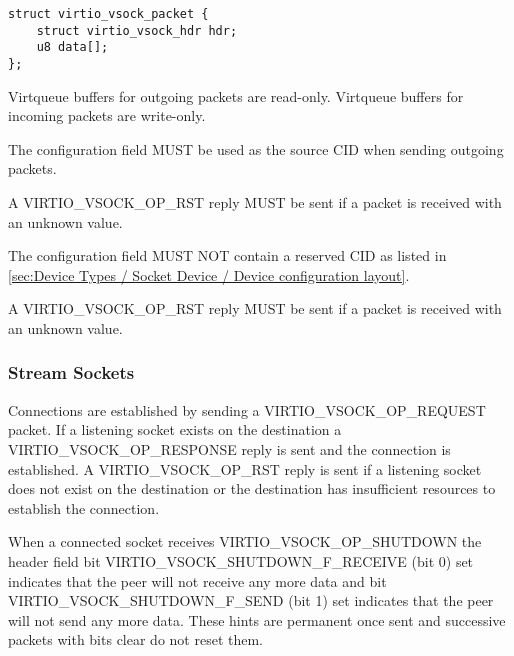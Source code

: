 \begin{lstlisting}
struct virtio_vsock_packet {
    struct virtio_vsock_hdr hdr;
    u8 data[];
};
\end{lstlisting}

Virtqueue buffers for outgoing packets are read-only. Virtqueue buffers for
incoming packets are write-only.


The  configuration field MUST be used as the source CID when
sending outgoing packets.

A VIRTIO_VSOCK_OP_RST reply MUST be sent if a packet is received with an
unknown  value.


The  configuration field MUST NOT contain a reserved CID as listed in \ref{sec:Device Types / Socket Device / Device configuration layout}.

A VIRTIO_VSOCK_OP_RST reply MUST be sent if a packet is received with an
unknown  value.

\subsubsection{Stream Sockets}\label{sec:Device Types / Socket Device / Device Operation / Stream Sockets}

Connections are established by sending a VIRTIO_VSOCK_OP_REQUEST packet. If a
listening socket exists on the destination a VIRTIO_VSOCK_OP_RESPONSE reply is
sent and the connection is established.  A VIRTIO_VSOCK_OP_RST reply is sent if
a listening socket does not exist on the destination or the destination has
insufficient resources to establish the connection.

When a connected socket receives VIRTIO_VSOCK_OP_SHUTDOWN the header
 field bit VIRTIO_VSOCK_SHUTDOWN_F_RECEIVE (bit 0) set indicates
that the peer will not receive any more data and bit VIRTIO_VSOCK_SHUTDOWN_F_SEND
(bit 1) set indicates that the peer will not send any more data.  These hints are
permanent once sent and successive packets with bits clear do not reset them.

